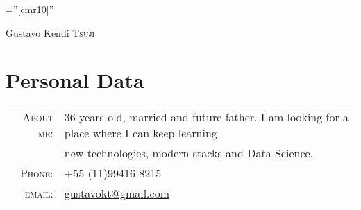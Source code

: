 \documentclass[a4paper,10pt]{article}
\begin{document}

\pagestyle{empty} %

\font\fb=''[cmr10]'' %

\par{\centering
    {\Huge Gustavo Kendi \textsc{Tsuji}
  }\bigskip\par}

\section{Personal Data}

\begin{tabular}{rl}
  \textsc{About me:}   & 36 years old, married and future father. I am looking for a place where I can keep learning \\
    &new technologies, modern stacks and Data Science.\\
    \textsc{Phone:}     & +55 (11)99416-8215\\
    \textsc{email:}     & \href{mailto:gustavokt@gmail.com}{gustavokt@gmail.com}
\end{tabular}

\end{document}
